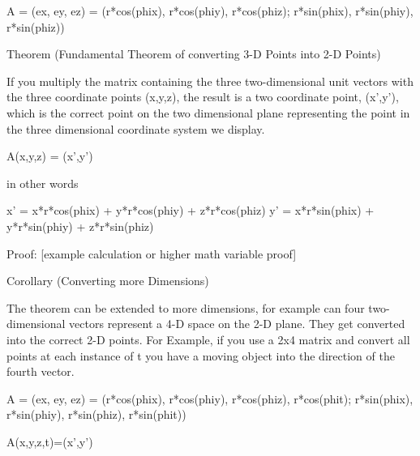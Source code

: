 A = (ex, ey, ez) 
  = (r*cos(phix), r*cos(phiy), r*cos(phiz);
     r*sin(phix), r*sin(phiy), r*sin(phiz))

Theorem (Fundamental Theorem of converting 3-D Points into 2-D Points)

If you multiply the matrix containing the three two-dimensional unit vectors
with the three coordinate points (x,y,z), the result is a two coordinate point, 
(x',y'), which is the correct point on the two dimensional plane representing the point
in the three dimensional coordinate system we display.

A(x,y,z) = (x',y')

in other words

x' = x*r*cos(phix) + y*r*cos(phiy) + z*r*cos(phiz)
y' = x*r*sin(phix) + y*r*sin(phiy) + z*r*sin(phiz)

Proof:
[example calculation or higher math variable proof]

Corollary (Converting more Dimensions)

The theorem can be extended to more dimensions, for example can four two-dimensional
vectors represent a 4-D space on the 2-D plane. They get converted into the correct
2-D points. For Example, if you use a 2x4 matrix and convert all points at each 
instance of t you have a moving object into the direction of the fourth vector. 

A = (ex, ey, ez) 
  = (r*cos(phix), r*cos(phiy), r*cos(phiz), r*cos(phit);
     r*sin(phix), r*sin(phiy), r*sin(phiz), r*sin(phit))

A(x,y,z,t)=(x',y')

